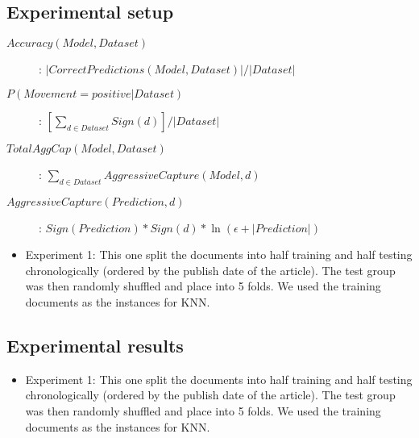 \documentclass[11pt,letterpaper]{article}
\newcommand{\blue}[1]{\textcolor{RoyalBlue}{#1}}
\newcommand{\instructions}[1]{\blue{\textit{#1}}}
\begin{document}
\subsection{Experimental setup}
\label{sec:experimental-setup}
\begin{description}
  \item[\(Accuracy(Model, Dataset)\)] : $|CorrectPredictions(Model, Dataset)| / |Dataset|$
  \item[\(P(Movement = positive | Dataset)\)] : $[\sum_{d \in Dataset} Sign(d)] / |Dataset|$
  \item[\(TotalAggCap(Model, Dataset)\)] : $\sum_{d \in Dataset} AggressiveCapture(Model, d) $
  \item[\(AggressiveCapture(Prediction, d)\)] : $Sign(Prediction) * Sign(d) * \ln(\epsilon + |Prediction|)$
\end{description}

\begin{itemize}
  \item Experiment 1: This one split the documents into half training and half testing
  chronologically (ordered by the publish date of the article). The test group
  was then randomly shuffled and place into 5 folds. We used the training documents as the
  instances for KNN.
\end{itemize}

\subsection{Experimental results}
\label{sec:experimental-results}
\begin{itemize}
  \item Experiment 1: This one split the documents into half training and half testing
  chronologically (ordered by the publish date of the article). The test group
  was then randomly shuffled and place into 5 folds. We used the training documents as the
  instances for KNN.
\end{itemize}
\end{document}
